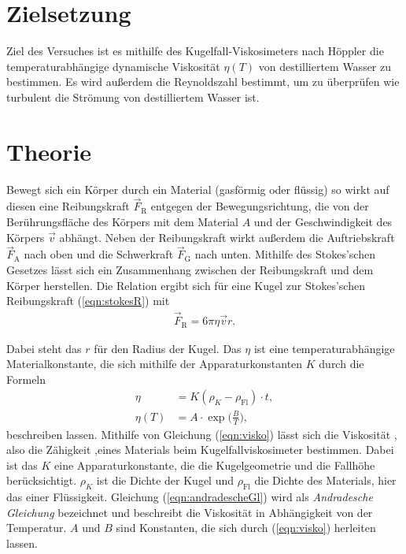 \section{Zielsetzung}
\label{sec:Ziel}
Ziel des Versuches ist es mithilfe des Kugelfall-Viskosimeters nach Höppler die temperaturabhängige dynamische Viskosität $\eta(T)$ 
von destilliertem Wasser zu bestimmen. Es wird außerdem die Reynoldszahl bestimmt, um zu überprüfen wie turbulent die Strömung von
destilliertem Wasser ist.

\section{Theorie}
\label{sec:Theorie}

Bewegt sich ein Körper durch ein Material (gasförmig oder flüssig) so wirkt auf diesen eine Reibungskraft $\vec F_{\text{R}}$ entgegen der
Bewegungsrichtung, die von der Berührungsfläche des Körpers mit dem Material $A$ und der Geschwindigkeit des Körpers $\vec v$ abhängt.
Neben der Reibungskraft wirkt außerdem die Auftriebskraft $\vec F_{\text{A}}$ nach oben und die Schwerkraft $\vec F_{\text{G}}$ nach unten.
\newline Mithilfe des Stokes'schen Gesetzes lässt sich ein Zusammenhang zwischen der Reibungskraft und dem Körper herstellen. Die Relation ergibt
sich für eine Kugel zur Stokes'schen Reibungskraft (\ref{eqn:stokesR}) mit
\begin{align}
    \vec F_{\text{R}} = 6\pi\eta\vec v r.
    \label{eqn:stokesR}
\end{align}

Dabei steht das $r$ für den Radius der Kugel. Das $\eta$ ist eine temperaturabhängige Materialkonstante, die sich mithilfe der
Apparaturkonstanten $K$ durch die Formeln
\begin{align}
    \label{eqn:visko}
    \eta &= K (\rho_{K} - \rho_{\text{Fl}}) \cdot t, \\
    \label{eqn:andradescheGl}
    \eta(T) &= A\cdot\exp\Big(\frac{B}{T} \Big),
\end{align}
beschreiben lassen. \newline
Mithilfe von Gleichung (\ref{eqn:visko}) lässt sich die Viskosität , also die Zähigkeit ,eines Materials beim Kugelfallviskosimeter
bestimmen. Dabei ist das $K$ eine Apparaturkonstante, die die Kugelgeometrie und die Fallhöhe berücksichtigt.
$\rho_{K}$  ist die Dichte der Kugel und $\rho_{\text{Fl}}$ die Dichte des Materials, hier das einer Flüssigkeit. \newline
Gleichung (\ref{eqn:andradescheGl}) wird als \textit{Andradesche Gleichung} bezeichnet und beschreibt die Viskosität in Abhängigkeit 
von der Temperatur. $A$ und $B$ sind Konstanten, die sich durch (\ref{eqn:visko}) herleiten lassen.

